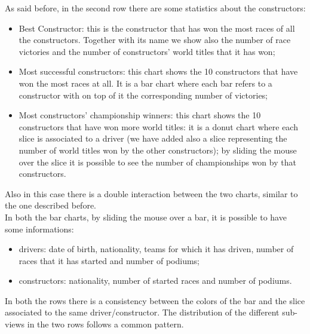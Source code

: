 \documentclass[11pt,twocolumn,letterpaper]{article}
\begin{document}
As said before, in the second row there are some statistics about the constructors:
\begin{itemize}
	\item Best Constructor: this is the constructor that has won the most races of all the constructors. Together with its name we show also the number of race victories and the number of constructors' world titles that it has won;
	\item Most successful constructors: this chart shows the 10 constructors that have won the most races at all. It is a bar chart where each bar refers to a constructor with on top of it the corresponding number of victories;
	\item Most constructors' championship winners: this chart shows the 10 constructors that have won more world titles: it is a donut chart where each slice is associated to a driver (we have added also a slice representing the number of world titles won by the other constructors); by sliding the mouse over the slice it is possible to see the number of championships won by that constructors.
\end{itemize}
Also in this case there is a double interaction between the two charts, similar to the one described before.\\
In both the bar charts, by sliding the mouse over a bar, it is possible to have some informations:
\begin{itemize}
	\item drivers: date of birth, nationality, teams for which it has driven, number of races that it has started and number of podiums;
	\item constructors: nationality, number of started races and number of podiums.
\end{itemize}
In both the rows there is a consistency between the colors of the bar and the slice associated to the same driver/constructor. The distribution of the different sub-views in the two rows follows a common pattern.

\newpage
\end{document}
